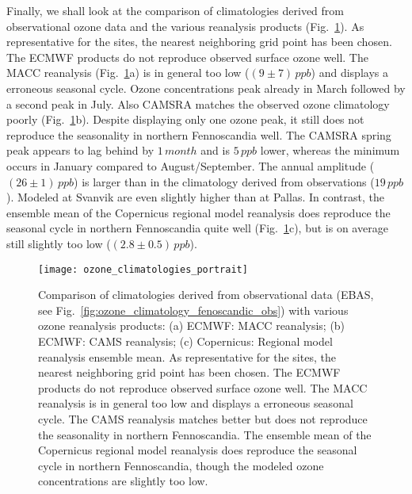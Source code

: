 \documentclass[bg, manuscript]{copernicus}
\begin{document}
Finally, we shall look at the comparison of climatologies derived from observational ozone data and the various reanalysis products (Fig.~\ref{fig:ozone_climatologies}). As representative for the sites, the nearest neighboring grid point has been chosen. The ECMWF products do not reproduce observed surface ozone well. The MACC reanalysis (Fig.~\ref{fig:ozone_climatologies}a) is in general too low ($(9\pm 7)\,\unit{ppb}$) and displays a erroneous seasonal cycle. Ozone concentrations peak already in March followed by a second peak in July. Also CAMSRA matches the observed ozone climatology poorly (Fig.~\ref{fig:ozone_climatologies}b). Despite displaying only one ozone peak, it still does not reproduce the seasonality in northern Fennoscandia well. The CAMSRA spring peak appears to lag behind by $1\,\unit{month}$ and is $5\,\unit{ppb}$ lower, whereas the minimum occurs in January compared to August/September. The annual amplitude ($(26\pm 1)\,\unit{ppb}$) is larger than in the climatology derived from observations ($19\,\unit{ppb}$). Modeled \chem{[O_3]} at Svanvik are even slightly higher than at Pallas. In contrast, the ensemble mean of the Copernicus regional model reanalysis does reproduce the seasonal cycle in northern Fennoscandia quite well (Fig.~\ref{fig:ozone_climatologies}c), but is on average still slightly too low ($(2.8\pm 0.5)\,\unit{ppb}$).

\begin{figure}[t]
  \texttt{[image: ozone\_climatologies\_portrait]}
  \caption{Comparison of climatologies derived from observational data (EBAS, see Fig.~\ref{fig:ozone_climatology_fenoscandic_obs}) with various ozone reanalysis products: (a) ECMWF: MACC reanalysis; (b) ECMWF: CAMS reanalysis; (c) Copernicus: Regional model reanalysis ensemble mean. As representative for the sites, the nearest neighboring grid point has been chosen. The ECMWF products do not reproduce observed surface ozone well. The MACC reanalysis is in general too low and displays a erroneous seasonal cycle. The CAMS reanalysis matches better but does not reproduce the seasonality in northern Fennoscandia. The ensemble mean of the Copernicus regional model reanalysis does reproduce the seasonal cycle in northern Fennoscandia, though the modeled ozone concentrations are slightly too low.}
  \label{fig:ozone_climatologies}
\end{figure}
\end{document}
